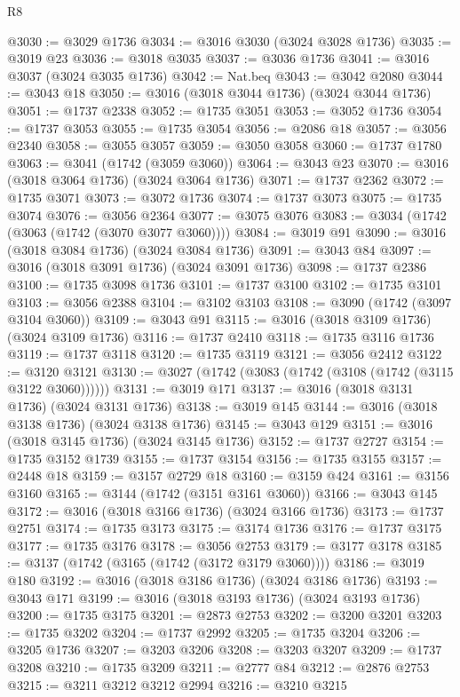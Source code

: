 \begin{lexlean}{R8}
\begin{coremodule}
@3030 := @3029 @1736
@3034 := @3016 @3030 (@3024 @3028 @1736)
@3035 := @3019 @23
@3036 := @3018 @3035
@3037 := @3036 @1736
@3041 := @3016 @3037 (@3024 @3035 @1736)
@3042 := Nat.beq
@3043 := @3042 @2080
@3044 := @3043 @18
@3050 := @3016 (@3018 @3044 @1736) (@3024 @3044 @1736)
@3051 := @1737 @2338
@3052 := @1735 @3051
@3053 := @3052 @1736
@3054 := @1737 @3053
@3055 := @1735 @3054
@3056 := @2086 @18
@3057 := @3056 @2340
@3058 := @3055 @3057
@3059 := @3050 @3058
@3060 := @1737 @1780
@3063 := @3041 (@1742 (@3059 @3060))
@3064 := @3043 @23
@3070 := @3016 (@3018 @3064 @1736) (@3024 @3064 @1736)
@3071 := @1737 @2362
@3072 := @1735 @3071
@3073 := @3072 @1736
@3074 := @1737 @3073
@3075 := @1735 @3074
@3076 := @3056 @2364
@3077 := @3075 @3076
@3083 := @3034 (@1742 (@3063 (@1742 (@3070 @3077 @3060))))
@3084 := @3019 @91
@3090 := @3016 (@3018 @3084 @1736) (@3024 @3084 @1736)
@3091 := @3043 @84
@3097 := @3016 (@3018 @3091 @1736) (@3024 @3091 @1736)
@3098 := @1737 @2386
@3100 := @1735 @3098 @1736
@3101 := @1737 @3100
@3102 := @1735 @3101
@3103 := @3056 @2388
@3104 := @3102 @3103
@3108 := @3090 (@1742 (@3097 @3104 @3060))
@3109 := @3043 @91
@3115 := @3016 (@3018 @3109 @1736) (@3024 @3109 @1736)
@3116 := @1737 @2410
@3118 := @1735 @3116 @1736
@3119 := @1737 @3118
@3120 := @1735 @3119
@3121 := @3056 @2412
@3122 := @3120 @3121
@3130 := @3027 (@1742 (@3083 (@1742 (@3108 (@1742 (@3115 @3122 @3060))))))
@3131 := @3019 @171
@3137 := @3016 (@3018 @3131 @1736) (@3024 @3131 @1736)
@3138 := @3019 @145
@3144 := @3016 (@3018 @3138 @1736) (@3024 @3138 @1736)
@3145 := @3043 @129
@3151 := @3016 (@3018 @3145 @1736) (@3024 @3145 @1736)
@3152 := @1737 @2727
@3154 := @1735 @3152 @1739
@3155 := @1737 @3154
@3156 := @1735 @3155
@3157 := @2448 @18
@3159 := @3157 @2729 @18
@3160 := @3159 @424
@3161 := @3156 @3160
@3165 := @3144 (@1742 (@3151 @3161 @3060))
@3166 := @3043 @145
@3172 := @3016 (@3018 @3166 @1736) (@3024 @3166 @1736)
@3173 := @1737 @2751
@3174 := @1735 @3173
@3175 := @3174 @1736
@3176 := @1737 @3175
@3177 := @1735 @3176
@3178 := @3056 @2753
@3179 := @3177 @3178
@3185 := @3137 (@1742 (@3165 (@1742 (@3172 @3179 @3060))))
@3186 := @3019 @180
@3192 := @3016 (@3018 @3186 @1736) (@3024 @3186 @1736)
@3193 := @3043 @171
@3199 := @3016 (@3018 @3193 @1736) (@3024 @3193 @1736)
@3200 := @1735 @3175
@3201 := @2873 @2753
@3202 := @3200 @3201
@3203 := @1735 @3202
@3204 := @1737 @2992
@3205 := @1735 @3204
@3206 := @3205 @1736
@3207 := @3203 @3206
@3208 := @3203 @3207
@3209 := @1737 @3208
@3210 := @1735 @3209
@3211 := @2777 @84
@3212 := @2876 @2753
@3215 := @3211 @3212 @3212 @2994
@3216 := @3210 @3215

\end{coremodule}
\end{lexlean}
